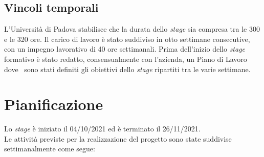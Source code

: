 \subsection{Vincoli temporali}
L'Università di Padova stabilisce che la durata dello \emph{stage} sia compresa tra le 300 e le 320 ore.
Il carico di lavoro è stato suddiviso in otto settimane consecutive, con un impegno lavorativo di 40 ore settimanali.
Prima dell'inizio dello \emph{stage} formativo è stato redatto, consensualmente con l'azienda, un Piano di Lavoro dove \
sono stati definiti gli obiettivi dello \emph{stage} ripartiti tra le varie settimane.

\section{Pianificazione}
Lo \emph{stage} è iniziato il 04/10/2021 ed è terminato il 26/11/2021. \\
Le attività previste per la realizzazione del progetto sono state suddivise settimanalmente come segue:
